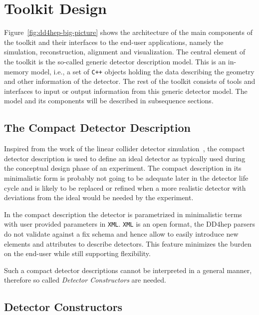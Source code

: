 \section{Toolkit Design}
\label{sec:toolkit-design}

Figure~\ref{fig:dd4hep-big-picture} shows the architecture  of the main components of the toolkit and their interfaces  to the end-user applications, namely the simulation, reconstruction, alignment and visualization.  The central element of the toolkit is the so-called generic detector description model. This is an in-memory model, i.e., a set of \texttt{C++} objects holding the data describing the geometry and other information of the detector. The rest of the toolkit consists of tools and interfaces to input or output information from this generic detector model. The model and its components will be described in subsequence sections.

\subsection{The Compact Detector Description}
\label{sec:problem_analysis}

Inspired from the work of the linear collider detector simulation~\cite{Gaede:81331}, the compact detector description is used to define an ideal detector as typically used during the conceptual design phase of an experiment. The compact description in its minimalistic form is probably not going to be adequate later in the detector life cycle and is likely to be replaced or refined when a more realistic detector with deviations from the ideal would be needed by the experiment.

In the compact description the detector is parametrized in minimalistic terms with user provided parameters in \texttt{XML}. \texttt{XML} is an open format, the DD4hep parsers do not validate against a fix schema and hence allow to easily introduce new elements and attributes to describe detectors. This feature minimizes the burden on the end-user while still  supporting flexibility.

Such a compact detector descriptions cannot be interpreted in a general manner, therefore so called \textit{Detector Constructors} are needed.

\subsection{Detector Constructors}
\label{sec:detector-constructors}

